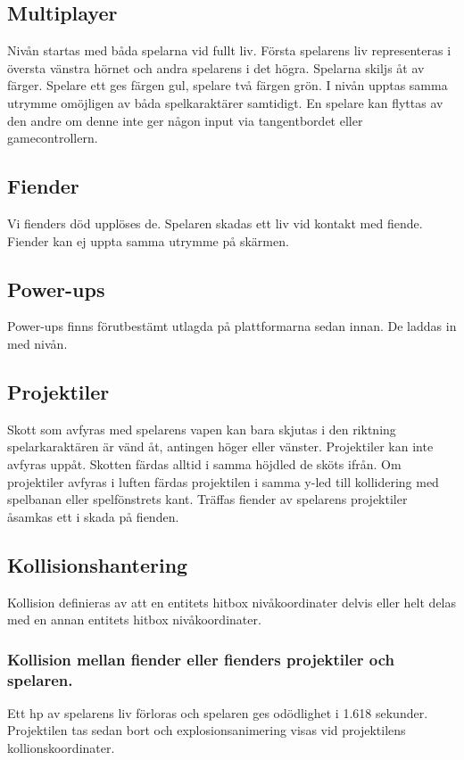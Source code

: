 \documentclass{TDP005mall}
\begin{document}
\subsection{Multiplayer}
Nivån startas med båda spelarna vid fullt liv. Första spelarens liv representeras i översta vänstra hörnet och andra spelarens i det högra. Spelarna skiljs åt av färger. Spelare ett ges färgen gul, spelare två färgen grön. I nivån upptas samma utrymme omöjligen av båda spelkaraktärer samtidigt. En spelare kan flyttas av den andre om denne inte ger någon input via tangentbordet eller gamecontrollern.

\subsection{Fiender}
Vi fienders död upplöses de. Spelaren skadas ett liv vid kontakt med fiende. Fiender kan ej uppta samma utrymme på skärmen.

\subsection{Power-ups}
Power-ups finns förutbestämt utlagda på plattformarna sedan innan. De laddas in med nivån.

\subsection{Projektiler}
Skott som avfyras med spelarens vapen kan bara skjutas i den riktning spelarkaraktären är vänd åt, antingen höger eller vänster. Projektiler kan inte avfyras uppåt. Skotten färdas alltid i samma höjdled de sköts ifrån. Om projektiler avfyras i luften färdas projektilen i samma y-led till kollidering med spelbanan eller spelfönstrets kant. Träffas fiender av spelarens projektiler åsamkas ett i skada på fienden.

\subsection{Kollisionshantering} %
Kollision definieras av att en entitets hitbox nivåkoordinater delvis eller helt delas med en annan entitets hitbox nivåkoordinater.
\subsubsection*{Kollision mellan fiender eller fienders projektiler och spelaren.\label{}}
Ett hp av spelarens liv förloras och spelaren ges odödlighet i 1.618 sekunder. Projektilen tas sedan bort och explosionsanimering visas vid projektilens kollionskoordinater.
\end{document}
